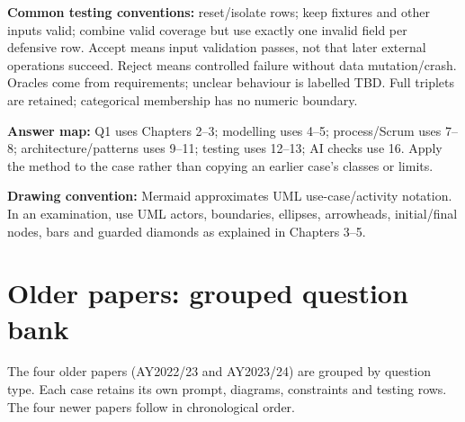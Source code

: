 \textbf{Common testing conventions:} reset/isolate rows; keep fixtures and other inputs valid; combine valid coverage but use exactly one invalid field per defensive row. Accept means input validation passes, not that later external operations succeed. Reject means controlled failure without data mutation/crash. Oracles come from requirements; unclear behaviour is labelled TBD. Full triplets are retained; categorical membership has no numeric boundary.

\textbf{Answer map:} Q1 uses Chapters 2--3; modelling uses 4--5; process/Scrum uses 7--8; architecture/patterns uses 9--11; testing uses 12--13; AI checks use 16. Apply the method to the case rather than copying an earlier case's classes or limits.

\textbf{Drawing convention:} Mermaid approximates UML use-case/activity notation. In an examination, use UML actors, boundaries, ellipses, arrowheads, initial/final nodes, bars and guarded diamonds as explained in Chapters 3--5.


\section*{Older papers: grouped question bank}\label{older-bank}
The four older papers (AY2022/23 and AY2023/24) are grouped by question type. Each case retains its own prompt, diagrams, constraints and testing rows. The four newer papers follow in chronological order.

